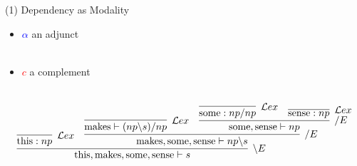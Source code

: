 \documentclass[aspectratio=169]{beamer}
\begin{document}
\begin{frame}{(1) Dependency as Modality}
{{		\begin{itemize}
			\item[] \textcolor{blue}{$\alpha$} an adjunct \\
			~
			\item[] \textcolor{red}{$c$} a complement\\
			~
		\end{itemize}
		\vfill
		
	}
	{
	\smaller
	\[
		\infer[\backslash E]{\text{this}, \text{makes}, \text{some}, \text{sense} \vdash s}{
			\infer[\mathcal{L}ex]{\text{this}: np}{}
			&
			\infer[/ E]{\text{makes}, \text{some}, \text{sense} \vdash np\backslash s}{
				\infer[\mathcal{L}ex]{\text{makes} \vdash(np \backslash s)/np}{}
				&
				\infer[/ E]{\text{some}, \text{sense} \vdash np}{
					\infer[\mathcal{L}ex]{\text{some}: np/ np}{}
					&
					\infer[\mathcal{L}ex]{\text{sense}: np}{}
				}
			}
		}
	\]
	}}
 \end{frame}
\end{document}
